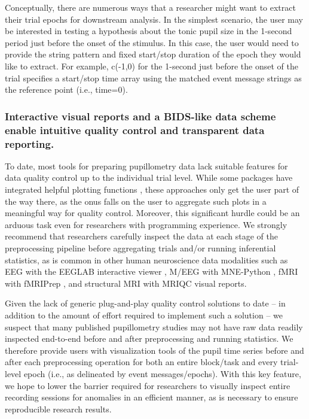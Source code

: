 Conceptually, there are numerous ways that a researcher might want to extract their trial epochs for downstream analysis. In the simplest scenario, the user may be interested in testing a hypothesis about the tonic pupil size in the 1-second period just before the onset of the stimulus. In this case, the user would need to provide the string pattern and fixed start/stop duration of the epoch they would like to extract. For example, c(-1,0) for the 1-second just before the onset of the trial specifies a start/stop time array using the matched event message strings as the reference point (i.e., time=0).

\subsubsection{Interactive visual reports and a BIDS-like data scheme enable intuitive quality control and transparent data reporting.}\label{sec:visual-reports}
To date, most tools for preparing pupillometry data lack suitable features for data quality control up to the individual trial level. While some packages have integrated helpful plotting functions \parencite[e.g.,][]{forbes2020pupillometryr,hershman2019chap,mittner2020pypillometry,tsukahara2020pupillometry}, these approaches only get the user part of the way there, as the onus falls on the user to aggregate such plots in a meaningful way for quality control. Moreover, this significant hurdle could be an arduous task even for researchers with programming experience. We strongly recommend that researchers carefully inspect the data at each stage of the preprocessing pipeline before aggregating trials and/or running inferential statistics, as is common in other human neuroscience data modalities such as EEG with the EEGLAB interactive viewer \parencite{delorme2004eeglab}, M/EEG with MNE-Python \parencite{gramfort2013meg}, fMRI with fMRIPrep \parencite{esteban2019fmriprep}, and structural MRI with MRIQC \parencite{esteban2017mriqc,provins2023quality} visual reports.

Given the lack of generic plug-and-play quality control solutions to date – in addition to the amount of effort required to implement such a solution – we suspect that many published pupillometry studies may not have raw data readily inspected end-to-end before and after preprocessing and running statistics. We therefore provide users with visualization tools of the pupil time series before and after each preprocessing operation for both an entire block/task and every trial-level epoch (i.e., as delineated by event messages/epochs). With this key feature, we hope to lower the barrier required for researchers to visually inspect entire recording sessions for anomalies in an efficient manner, as is necessary to ensure reproducible research results.

